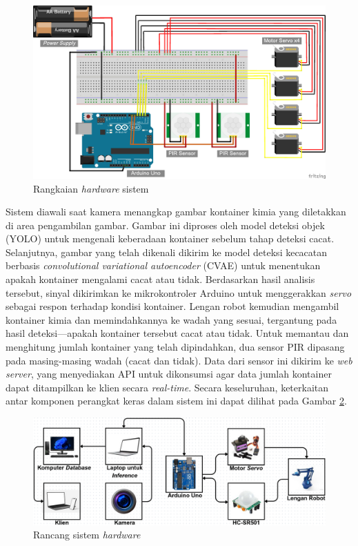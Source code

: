 \begin{figure}[H]
  \centering
  \includegraphics[width=\textwidth]{gambar/rangkaian.jpg}
  \caption{Rangkaian \textit{hardware} sistem}
  \label{fig:rangkaian}
\end{figure}
\vspace{-1em}

Sistem diawali saat kamera menangkap gambar kontainer kimia yang
diletakkan di area pengambilan gambar. Gambar ini diproses oleh model
deteksi objek (YOLO) untuk mengenali keberadaan kontainer sebelum
tahap deteksi cacat. Selanjutnya, gambar yang telah dikenali dikirim
ke model deteksi kecacatan berbasis \textit{convolutional variational
autoencoder} (CVAE) untuk
menentukan apakah kontainer mengalami cacat atau tidak. Berdasarkan
hasil analisis tersebut, sinyal dikirimkan ke mikrokontroler Arduino
untuk menggerakkan \textit{servo} sebagai respon terhadap kondisi kontainer.
Lengan robot kemudian mengambil kontainer kimia dan memindahkannya ke
wadah yang sesuai, tergantung pada hasil deteksi—apakah kontainer
tersebut cacat atau tidak. Untuk memantau dan menghitung jumlah
kontainer yang telah dipindahkan, dua sensor PIR dipasang pada
masing-masing wadah (cacat dan tidak). Data dari sensor ini
dikirim ke \textit{web server}, yang menyediakan API untuk dikonsumsi
agar data jumlah kontainer dapat ditampilkan ke klien secara
\textit{real-time}. Secara keseluruhan, keterkaitan antar komponen
perangkat keras dalam
sistem ini dapat dilihat pada Gambar \ref{fig:hardware}.

\begin{figure}[H]
  \centering
  \includegraphics[width=\textwidth]{gambar/rancang.png}
  \caption{Rancang sistem \textit{hardware}}
  \label{fig:hardware}
\end{figure}
\vspace{-1em}

